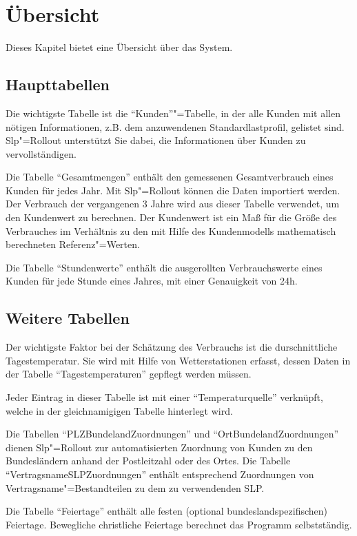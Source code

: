 \chapter{Übersicht}\label{chap:overview}

Dieses Kapitel bietet eine Übersicht über das System.

\section{Haupttabellen}

Die wichtigste Tabelle ist die "`Kunden"'"=Tabelle, in der alle Kunden mit allen nötigen Informationen, z.B. dem anzuwendenen Standardlastprofil, gelistet sind. Slp"=Rollout unterstützt Sie dabei, die Informationen über Kunden zu vervollständigen.

Die Tabelle "`Gesamtmengen"' enthält den gemessenen Gesamtverbrauch eines Kunden für jedes Jahr. Mit Slp"=Rollout können die Daten importiert werden.
Der Verbrauch der vergangenen 3 Jahre wird aus dieser Tabelle verwendet, um den Kundenwert zu berechnen. Der Kundenwert ist ein Maß für die Größe des Verbrauches im Verhältnis zu den mit Hilfe des Kundenmodells mathematisch berechneten Referenz"=Werten.

Die Tabelle "`Stundenwerte"' enthält die ausgerollten Verbrauchswerte eines Kunden für jede Stunde eines Jahres, mit einer Genauigkeit von 24h.

\section{Weitere Tabellen}

Der wichtigste Faktor bei der Schätzung des Verbrauchs ist die durschnittliche Tagestemperatur. Sie wird mit Hilfe von Wetterstationen erfasst, dessen Daten in der Tabelle "`Tagestemperaturen"' gepflegt werden müssen.

Jeder Eintrag in dieser Tabelle ist mit einer "`Temperaturquelle"' verknüpft, welche in der gleichnamigigen Tabelle hinterlegt wird.


Die Tabellen "`PLZBundelandZuordnungen"' und "`OrtBundelandZuordnungen"' dienen Slp"=Rollout zur automatisierten Zuordnung von Kunden zu den Bundesländern anhand der Postleitzahl oder des Ortes. Die Tabelle "`VertragsnameSLPZuordnungen"' enthält entsprechend Zuordnungen von Vertragsname"=Bestandteilen zu dem zu verwendenden SLP.

Die Tabelle "`Feiertage"' enthält alle festen (optional bundeslandspezifischen) Feiertage. Bewegliche christliche Feiertage berechnet das Programm selbstständig.

